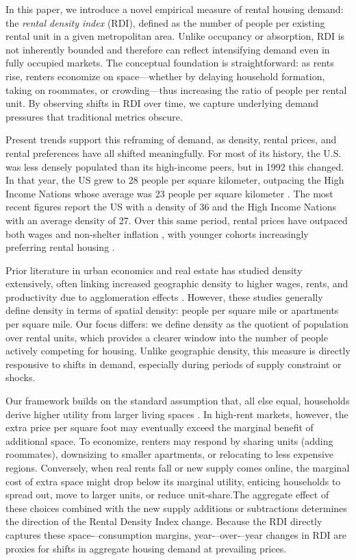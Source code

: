 \documentclass[APA,Times1COL]{WileyNJDv5} %
\begin{document}
In this paper, we introduce a novel empirical measure of rental housing demand: the \textit{rental density index} (RDI), defined as the number of people per existing rental unit in a given metropolitan area. Unlike occupancy or absorption, RDI is not inherently bounded and therefore can reflect intensifying demand even in fully occupied markets. The conceptual foundation is straightforward: as rents rise, renters economize on space---whether by delaying household formation, taking on roommates, or crowding---thus increasing the ratio of people per rental unit. By observing shifts in RDI over time, we capture underlying demand pressures that traditional metrics obscure.

Present trends support this reframing of demand, as density, rental prices, and rental preferences have all shifted meaningfully. For most of its history, the U.S. was less densely populated than its high-income peers, but in 1992 this changed. In that year, the US grew to 28 people per square kilometer, outpacing the High Income Nations whose average was 23 people per square kilometer \cite{worldbankPopDensity}. The most recent figures report the US with a density of 36 and the High Income Nations with an average density of 27.  Over this same period, rental prices have outpaced both wages and non-shelter inflation \cite{feiveson2024rent, stlouisfedConsumerPrice}, with younger cohorts increasingly preferring rental housing \cite{fanniemaeConsumersFeeling}.

Prior literature in urban economics and real estate has studied density extensively, often linking increased geographic density to higher wages, rents, and productivity due to agglomeration effects \cite{titman2024city, liu2018vertical}. However, these studies generally define density in terms of spatial density: people per square mile or  apartments per square mile. Our focus differs: we define density as the quotient of population over rental units, which provides a clearer window into the number of people actively competing for housing. Unlike geographic density, this measure is directly responsive to shifts in demand, especially during periods of supply constraint or shocks. 

Our framework builds on the standard assumption that, all else equal, households derive higher utility from larger living spaces \cite{muth1969cities,molloy2022housing}. In high-rent markets, however, the extra price per square foot may eventually exceed the marginal benefit of additional space. To economize, renters may respond by sharing units (adding roommates), downsizing to smaller apartments, or relocating to less expensive regions. Conversely, when real rents fall or new supply comes online, the marginal cost of extra space might drop below its marginal utility, enticing households to spread out, move to larger units, or reduce unit‐share.The aggregate effect of these choices combined with the new supply additions or subtractions determines the direction of the Rental Density Index change. Because the RDI directly captures these space‐--consumption margins, year‐--over‐--year changes in RDI are proxies for shifts in aggregate housing demand at prevailing prices.
\end{document}
